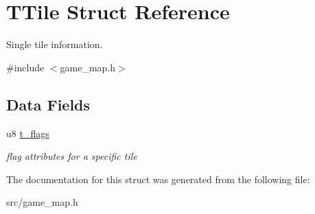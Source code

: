 \hypertarget{structTTile}{}\section{T\+Tile Struct Reference}
\label{structTTile}


Single tile information.  




{\ttfamily \#include $<$game\+\_\+map.\+h$>$}

\subsection*{Data Fields}
\begin{DoxyCompactItemize}
\item 
u8 \mbox{\hyperlink{group__GameMap_ga4e29a9a98bfa352440b628a995cba64d}{t\+\_\+flags}}
\begin{DoxyCompactList}\small\item\em flag attributes for a specific tile \end{DoxyCompactList}\end{DoxyCompactItemize}


The documentation for this struct was generated from the following file\+:\begin{DoxyCompactItemize}
\item 
src/game\+\_\+map.\+h\end{DoxyCompactItemize}
